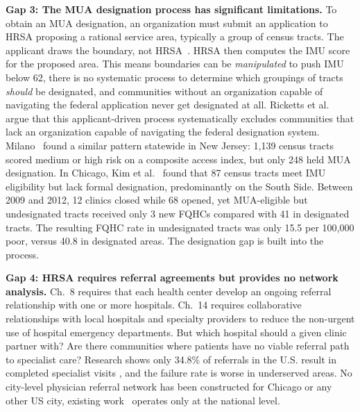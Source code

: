 \documentclass[11pt]{article}
\begin{document}
\medskip

\label{gap:mua}\textbf{Gap 3: The MUA designation process has significant limitations.} To obtain an MUA designation, 
an organization must submit an application to HRSA proposing a rational service area, typically a 
group of census tracts. The applicant draws the boundary, not HRSA~\cite{bphc2025compliance}. HRSA then 
computes the IMU score for the proposed area. This means boundaries can be \emph{manipulated} to push 
IMU below 62, there is no systematic process to determine which groupings of tracts \emph{should} be 
designated, and communities without an organization capable of navigating the federal application never 
get designated at all. Ricketts et al.~\cite{ricketts2007designating} argue that this applicant-driven 
process systematically excludes communities that lack an organization capable of navigating the federal 
designation system. Milano~\cite{milano2025spatial} found a similar pattern statewide in New Jersey: 1,139 
census tracts scored medium or high risk on a composite access index, but only 248 held MUA designation. 
In Chicago, Kim et al.~\cite{kim2020uneven} found that 87 census tracts meet IMU eligibility but lack formal 
designation, predominantly on the South Side. Between 2009 and 2012, 12 clinics closed while 68 opened, yet 
MUA-eligible but undesignated tracts received only 3 new FQHCs compared with 41 in designated tracts. The 
resulting FQHC rate in undesignated tracts was only 15.5 per 100,000 poor, versus 40.8 in designated areas. 
The designation gap is built into the process.

\medskip

\label{gap:referral}\textbf{Gap 4: HRSA requires referral agreements but provides no network analysis.} Ch.~8 requires that each health 
center develop an ongoing referral relationship with one or more hospitals. Ch.~14 requires collaborative relationships 
with local hospitals and specialty providers to reduce the non-urgent use of hospital emergency departments. But which 
hospital should a given clinic partner with? Are there communities where patients have no viable referral path to specialist 
care? Research shows only 34.8\% of referrals in the U.S. result in completed specialist visits \cite{patel2018closing}, 
and the failure rate is worse in underserved areas. No city-level physician referral network has been
constructed for Chicago or any other US city, existing
work~\cite{an2018analysis} operates only at the
national level.

\medskip
\end{document}
